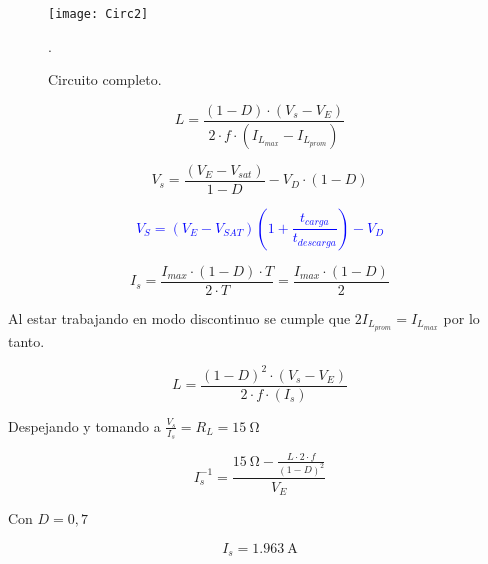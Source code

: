 \begin{figure}[H]
	\centering
	\texttt{[image: Circ2]}
	\caption{Circuito completo.}.
	\label{fig:Circ2}
\end{figure}



\begin{equation}
	{L} = \frac{(1-D) \cdot (V_s - V_E)}{2 \cdot f \cdot (I_{L_{max}} - I_{L_{prom}})}
\end{equation}

\begin{equation}
	V_s = \frac{(V_E - V_{sat})}{1-D} - V_D \cdot (1 - D) 
	\label{ec:Nose}
\end{equation}


\textcolor{blue}{$$V_S = (V_E-V_{SAT}) \left(  1 + \frac{t_{carga}}{t_{descarga}} \right) -V_D$$}


\begin{equation}
	I_s = \frac{I_{max} \cdot (1-D) \cdot T}{2 \cdot T} = \frac{I_{max} \cdot (1 - D)}{2} 
\end{equation}

Al estar trabajando en modo discontinuo se cumple que $ 2 I_{L_{prom}} =I_{L_{max}} $ por lo tanto.



\begin{equation}
	L = \frac{(1 - D)^2 \cdot (V_s - V_E)}{2 \cdot f \cdot (I_s)}
\end{equation}

Despejando y tomando a $\frac{V_s}{I_s} = R_L = \SI{15}{\ohm}$



\begin{equation}
	I_s^{-1} = \frac{\SI{15}{\ohm} - \frac{L \cdot 2 \cdot f}{(1-D)^2}}{V_E}
\end{equation}



Con $D=0,7$


\begin{equation}
	\boxed{I_s = \SI{1,963}{\ampere}}
\end{equation}


